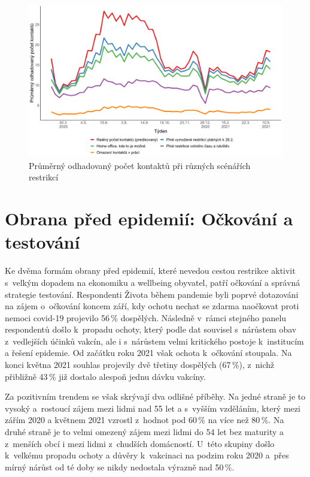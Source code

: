 \begin{figure}[ht]
    \centering
    \includegraphics[width=\textwidth]{./pic/zbp-graf5.png}
    \caption{Průměrný odhadovaný počet kontaktů při různých scénářích restrikcí}
    \label{fig:zbp5}
\end{figure}


\section*{Obrana před epidemií: Očkování a testování}

Ke dvěma formám obrany před epidemií, které nevedou cestou restrikce aktivit s velkým dopadem na ekonomiku a wellbeing obyvatel, patří očkování a správná strategie testování. Respondenti Života během pandemie byli poprvé dotazováni na zájem o~očkování koncem září, kdy ochotu nechat se zdarma naočkovat proti nemoci covid-19 projevilo 56\,\% dospělých. Následně v rámci stejného panelu respondentů došlo k propadu ochoty, který podle dat souvisel s nárůstem obav z vedlejších účinků vakcín, ale i s nárůstem velmi kritického postoje k institucím a řešení epidemie. Od začátku roku 2021 však ochota k očkování stoupala. Na konci května 2021 souhlas projevily dvě třetiny dospělých (67\,\%), z nichž přibližně 43\,\% již dostalo alespoň jednu dávku vakcíny. 

Za pozitivním trendem se však skrývají dva odlišné příběhy. Na jedné straně je to vysoký a rostoucí zájem mezi lidmi nad 55 let a s vyšším vzděláním, který mezi zářím 2020 a květnem 2021 vzrostl z hodnot pod 60\,\% na více než 80\,\%. Na druhé straně je to velmi omezený zájem mezi lidmi do 54 let bez maturity a z menších obcí i mezi lidmi z~chudších domácností. U této skupiny došlo k velkému propadu ochoty a důvěry k vakcinaci na podzim roku 2020 a přes mírný nárůst od té doby se nikdy nedostala výrazně nad 50\,\%. 

